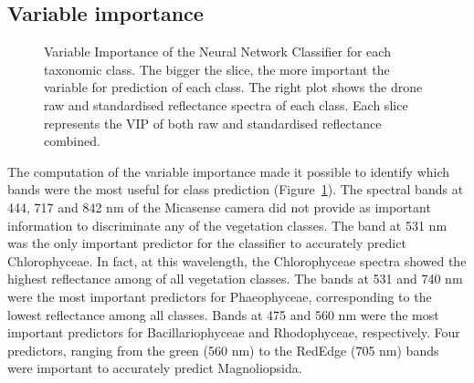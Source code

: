 \documentclass[
  number]{elsarticle}
\begin{document}
\subsection{Variable importance}\label{variable-importance}

\label{cell-fig-VIP}
\begin{figure}[H]


\caption{\label{fig-VIP}Variable Importance of the Neural Network
Classifier for each taxonomic class. The bigger the slice, the more
important the variable for prediction of each class. The right plot
shows the drone raw and standardised reflectance spectra of each class.
Each slice represents the VIP of both raw and standardised reflectance
combined.}

\end{figure}%

The computation of the variable importance made it possible to identify
which bands were the most useful for class prediction
(Figure~\ref{fig-VIP}). The spectral bands at 444, 717 and 842 nm of the
Micasense camera did not provide as important information to
discriminate any of the vegetation classes. The band at 531 nm was the
only important predictor for the classifier to accurately predict
Chlorophyceae. In fact, at this wavelength, the Chlorophyceae spectra
showed the highest reflectance among of all vegetation classes. The
bands at 531 and 740 nm were the most important predictors for
Phaeophyceae, corresponding to the lowest reflectance among all classes.
Bands at 475 and 560 nm were the most important predictors for
Bacillariophyceae and Rhodophyceae, respectively. Four predictors,
ranging from the green (560 nm) to the RedEdge (705 nm) bands were
important to accurately predict Magnoliopsida.
\end{document}

